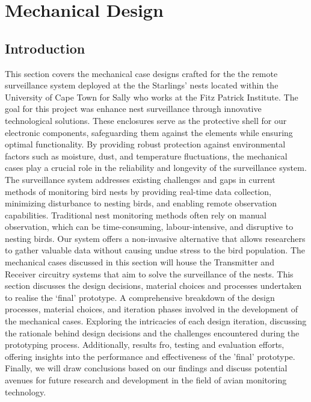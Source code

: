 \chapter{Mechanical Design}


\section{Introduction}
This section covers the mechanical case designs crafted for the the remote surveillance system deployed at the the Starlings’ nests located within the University of Cape Town for Sally who works at the Fitz Patrick Institute. The goal for this project was enhance nest surveillance through innovative technological solutions.  These enclosures serve as the protective shell for our electronic components, safeguarding them against the elements while ensuring optimal functionality. By providing robust protection against environmental factors such as moisture, dust, and temperature fluctuations, the mechanical cases play a crucial role in the reliability and longevity of the surveillance system.
The surveillance system addresses existing challenges and gaps in current methods of monitoring bird nests by providing real-time data collection, minimizing disturbance to nesting birds, and enabling remote observation capabilities. Traditional nest monitoring methods often rely on manual observation, which can be time-consuming, labour-intensive, and disruptive to nesting birds. Our system offers a non-invasive alternative that allows researchers to gather valuable data without causing undue stress to the bird population.
The mechanical cases discussed in this section will house the Transmitter and Receiver circuitry systems that aim to solve the surveillance of the nests. This section discusses the design decisions, material choices and processes undertaken to realise the ‘final’ prototype. 
A comprehensive breakdown of the design processes, material choices, and iteration phases involved in the development of the mechanical cases. Exploring the intricacies of each design iteration, discussing the rationale behind design decisions and the challenges encountered during the prototyping process. Additionally,  results fro, testing and evaluation efforts, offering insights into the performance and effectiveness of the 'final' prototype. Finally, we will draw conclusions based on our findings and discuss potential avenues for future research and development in the field of avian monitoring technology.


